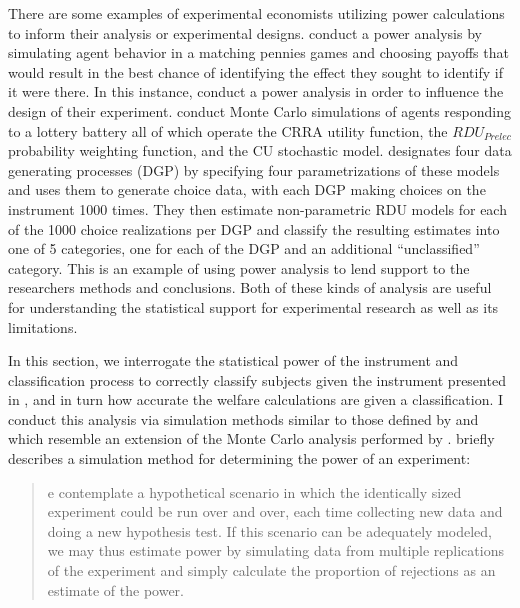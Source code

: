 \documentclass[../main.tex]{subfiles}
\begin{document}
There are some examples of experimental economists utilizing power calculations to inform their analysis or experimental designs.
\textcite{Rutstrom2009} conduct a power analysis by simulating agent behavior in a matching pennies games and choosing payoffs that would result in the best chance of identifying the effect they sought to identify if it were there.
In this instance, \textcite{Rutstrom2009} conduct a power analysis in order to influence the design of their experiment.
\textcite[8]{Wilcox2015} conduct Monte Carlo simulations of agents responding to a lottery battery all of which operate the CRRA utility function, the $\mathit{RDU_{Prelec}}$ probability weighting function, and the CU stochastic model.
\textcite{Wilcox2015} designates four data generating processes (DGP) by specifying four parametrizations of these models and uses them to generate choice data, with each DGP making choices on the instrument 1000 times.
They then estimate non-parametric RDU models for each of the 1000 choice realizations per DGP and classify the resulting estimates into one of 5 categories, one for each of the DGP and an additional \enquote{unclassified} category.
This is an example of using power analysis to lend support to the researchers methods and conclusions.
Both of these kinds of analysis are useful for understanding the statistical support for experimental research as well as its limitations.

In this section, we interrogate the statistical power of the instrument and classification process to correctly classify subjects given the instrument presented in \textcite{Harrison2016}, and in turn how accurate the welfare calculations are given a classification.
I conduct this analysis via simulation methods similar to those defined by \textcite{Feiveson2002} and which resemble an extension of the Monte Carlo analysis performed by \textcite{Wilcox2015}.
\textcite[108]{Feiveson2002} briefly describes a simulation method for determining the power of an experiment:

\blockquote{e contemplate a hypothetical scenario in which the identically sized experiment could be run over and over, each time collecting new data and doing a new hypothesis test. 
If this scenario can be adequately modeled, we may thus estimate power by simulating data from multiple replications of the experiment and simply calculate the proportion of rejections  as an estimate of the power.}
\end{document}
